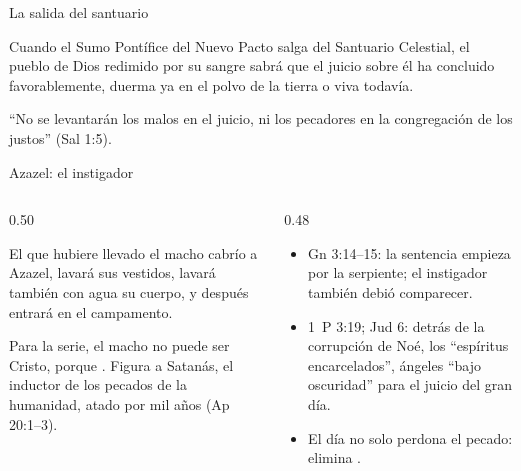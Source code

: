 \begin{frame}{La salida del santuario}
\begin{tcolorbox}[colback=papiro,colframe=tierraroja,boxrule=1pt,arc=3pt,fontupper=\small\itshape]
Cuando el Sumo Pontífice del Nuevo Pacto salga del Santuario Celestial, el pueblo de Dios redimido por su sangre sabrá que el juicio sobre él ha concluido favorablemente, duerma ya en el polvo de la tierra o viva todavía.
\end{tcolorbox}
\centering
{}\par
\scriptsize ``No se levantarán los malos en el juicio, ni los pecadores en la congregación de los justos'' (Sal 1:5).
\end{frame}

\begin{frame}{Azazel: el instigador}
\begin{columns}[t,onlytextwidth]
\begin{column}{0.50\textwidth}
\begin{cita}[fontupper=\scriptsize\itshape]El que hubiere llevado el macho cabrío a Azazel, lavará sus vestidos, lavará también con agua su cuerpo, y después entrará en el campamento.\end{cita}
\scriptsize Para la serie, el macho no puede ser Cristo, porque . Figura a Satanás, el inductor de los pecados de la humanidad, atado por mil años (Ap 20:1--3).
\end{column}
\begin{column}{0.48\textwidth}\scriptsize
{}
\begin{itemize}
\item Gn 3:14--15: la sentencia empieza por la serpiente; el instigador también debió comparecer.
\item 1~P 3:19; Jud 6: detrás de la corrupción de Noé, los ``espíritus encarcelados'', ángeles ``bajo oscuridad'' para el juicio del gran día.
\item El día no solo perdona el pecado: elimina .
\end{itemize}
\end{column}
\end{columns}
\end{frame}


